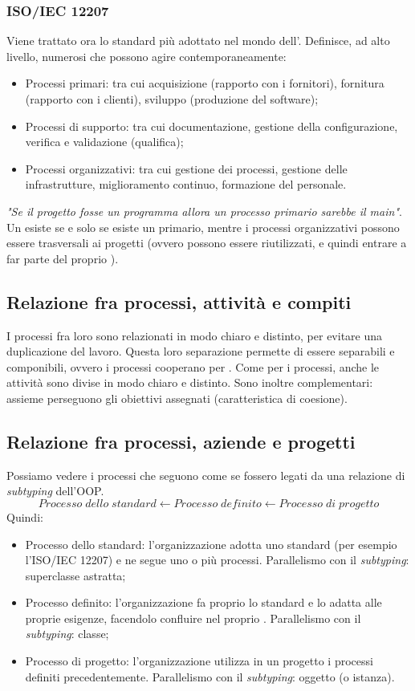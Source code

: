 \documentclass[../main.tex]{subfiles}
\begin{document}
\subsubsection{ISO/IEC 12207}
Viene trattato ora lo standard più adottato nel mondo dell'. Definisce, ad alto livello, numerosi  che possono agire contemporaneamente:
\begin{itemize}
    \item Processi primari: tra cui acquisizione (rapporto con i fornitori), fornitura (rapporto con i clienti), sviluppo (produzione del software);
    \item Processi di supporto: tra cui documentazione, gestione della configurazione, verifica e validazione (qualifica);
    \item Processi organizzativi: tra cui gestione dei processi, gestione delle infrastrutture, miglioramento continuo, formazione del personale.
\end{itemize}
\textit{"Se il progetto fosse un programma allora un processo primario sarebbe il main"}. Un  esiste se e solo se esiste un  primario, mentre i processi organizzativi possono essere trasversali ai progetti (ovvero possono essere riutilizzati, e quindi entrare a far parte del proprio ).
\subsection{Relazione fra processi, attività e compiti}
I processi fra loro sono relazionati in modo chiaro e distinto, per evitare una duplicazione del lavoro. Questa loro separazione permette di essere separabili e componibili, ovvero i processi cooperano per .
Come per i processi, anche le attività sono divise in modo chiaro e distinto. Sono inoltre complementari: assieme perseguono gli obiettivi assegnati (caratteristica di coesione).
\subsection{Relazione fra processi, aziende e progetti}
Possiamo vedere i processi che seguono come se fossero legati da una relazione di \textit{subtyping} dell'OOP.
$$Processo\;dello\;standard \leftarrow Processo\;definito \leftarrow Processo\;di\;progetto$$
Quindi:
\begin{itemize}
    \item Processo dello standard: l'organizzazione adotta uno standard (per esempio l'ISO/IEC 12207) e ne segue uno o più processi. Parallelismo con il \textit{subtyping}: superclasse astratta;
    \item Processo definito: l'organizzazione fa proprio lo standard e lo adatta alle proprie esigenze, facendolo confluire nel proprio . Parallelismo con il \textit{subtyping}: classe;
    \item Processo di progetto: l'organizzazione utilizza in un progetto i processi definiti precedentemente. Parallelismo con il \textit{subtyping}: oggetto (o istanza).
\end{itemize}
\end{document}
